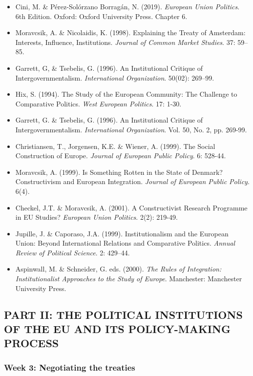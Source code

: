\begin{itemize}
	\item Cini, M. \& P\'{e}rez-Sol\'{o}rzano Borrag\'{a}n, N. (2019). \textit{European Union Politics}. 6th Edition. Oxford: Oxford University Press. Chapter 6.
	\item Moravcsik, A. \& Nicolaidis, K. (1998). Explaining the Treaty of Amsterdam: Interests, Influence, Institutions. \textit{Journal of Common Market Studies}. 37: 59–85.
	\item Garrett, G, \& Tsebelis, G. (1996). An Institutional Critique of Intergovernmentalism. \textit{International Organization}. 50(02): 269–99.
	\item Hix, S. (1994). The Study of the European Community: The Challenge to Comparative Politics. \textit{West European Politics}. 17: 1-30.
	\item Garrett, G. \& Tsebelis, G. (1996). An Institutional Critique of Intergovernmentalism. \textit{International Organization}. Vol. 50, No. 2, pp. 269-99.
	\item Christiansen, T., Jorgensen, K.E. \& Wiener, A. (1999). The Social Construction of Europe. \textit{Journal of European Public Policy}. 6: 528-44.
	\item Moravcsik, A. (1999). Is Something Rotten in the State of Denmark? Constructivism and European Integration. \textit{Journal of European Public Policy}. 6(4).
	\item Checkel, J.T. \& Moravcsik, A. (2001). A Constructivist Research Programme in EU Studies? \textit{European Union Politics}. 2(2): 219-49.
	\item Jupille, J. \& Caporaso, J.A. (1999). Institutionalism and the European Union: Beyond International Relations and Comparative Politics. \textit{Annual Review of Political Science}. 2: 429–44.
	\item Aspinwall, M. \& Schneider, G. eds. (2000). \textit{The Rules of Integration: Institutionalist Approaches to the Study of Europe}. Manchester: Manchester University Press.
\end{itemize}


\subsection*{PART II: THE POLITICAL INSTITUTIONS OF THE EU AND ITS POLICY-MAKING PROCESS}

\subsubsection*{Week 3: Negotiating the treaties}

